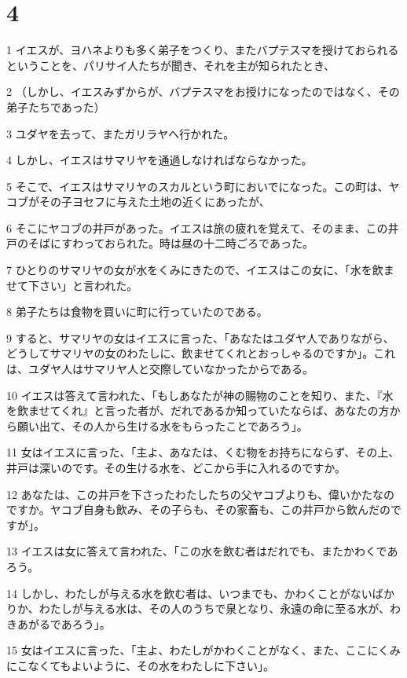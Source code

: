 \chapter{4}

\par 1 イエスが、ヨハネよりも多く弟子をつくり、またバプテスマを授けておられるということを、パリサイ人たちが聞き、それを主が知られたとき、
\par 2 （しかし、イエスみずからが、バプテスマをお授けになったのではなく、その弟子たちであった）
\par 3 ユダヤを去って、またガリラヤへ行かれた。
\par 4 しかし、イエスはサマリヤを通過しなければならなかった。
\par 5 そこで、イエスはサマリヤのスカルという町においでになった。この町は、ヤコブがその子ヨセフに与えた土地の近くにあったが、
\par 6 そこにヤコブの井戸があった。イエスは旅の疲れを覚えて、そのまま、この井戸のそばにすわっておられた。時は昼の十二時ごろであった。
\par 7 ひとりのサマリヤの女が水をくみにきたので、イエスはこの女に、「水を飲ませて下さい」と言われた。
\par 8 弟子たちは食物を買いに町に行っていたのである。
\par 9 すると、サマリヤの女はイエスに言った、「あなたはユダヤ人でありながら、どうしてサマリヤの女のわたしに、飲ませてくれとおっしゃるのですか」。これは、ユダヤ人はサマリヤ人と交際していなかったからである。
\par 10 イエスは答えて言われた、「もしあなたが神の賜物のことを知り、また、『水を飲ませてくれ』と言った者が、だれであるか知っていたならば、あなたの方から願い出て、その人から生ける水をもらったことであろう」。
\par 11 女はイエスに言った、「主よ、あなたは、くむ物をお持ちにならず、その上、井戸は深いのです。その生ける水を、どこから手に入れるのですか。
\par 12 あなたは、この井戸を下さったわたしたちの父ヤコブよりも、偉いかたなのですか。ヤコブ自身も飲み、その子らも、その家畜も、この井戸から飲んだのですが」。
\par 13 イエスは女に答えて言われた、「この水を飲む者はだれでも、またかわくであろう。
\par 14 しかし、わたしが与える水を飲む者は、いつまでも、かわくことがないばかりか、わたしが与える水は、その人のうちで泉となり、永遠の命に至る水が、わきあがるであろう」。
\par 15 女はイエスに言った、「主よ、わたしがかわくことがなく、また、ここにくみにこなくてもよいように、その水をわたしに下さい」。
